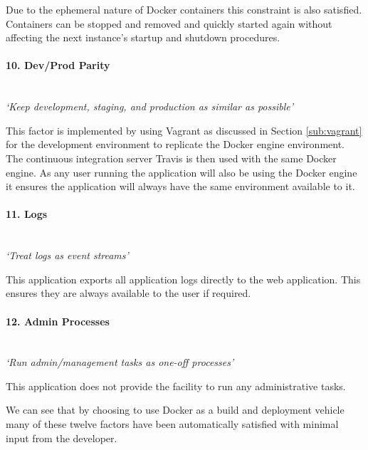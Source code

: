 Due to the ephemeral nature of \gls{Docker container}s this constraint is also satisfied. Containers can be stopped and removed and quickly started again without affecting the next instance's startup and shutdown procedures.

\paragraph{10. Dev/Prod Parity}\mbox{}\\
\textit{`Keep development, staging, and production as similar as possible'}

This factor is implemented by using Vagrant as discussed in Section \ref{sub:vagrant} for the development environment to replicate the Docker engine environment. The \gls{continuous integration} server Travis is then used with the same Docker engine. As any user running the application will also be using the Docker engine it ensures the application will always have the same environment available to it.

\paragraph{11. Logs}\mbox{}\\
\textit{`Treat logs as event streams'}

This application exports all application logs directly to the web application. This ensures they are always available to the user if required.

\paragraph{12. Admin Processes}\mbox{}\\
\textit{`Run admin/management tasks as one-off processes'}

This application does not provide the facility to run any administrative tasks.

We can see that by choosing to use Docker as a build and deployment vehicle many of these twelve factors have been automatically satisfied with minimal input from the developer.
